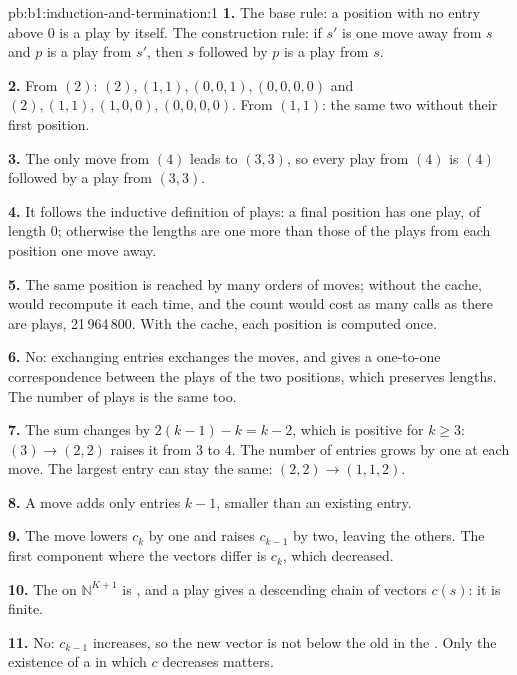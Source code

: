 \begin{solution}{pb:b1:induction-and-termination:1}
\textbf{1.} The base rule: a position with no entry above 0 is a play by itself. The construction rule: if $s'$ is one
move away from $s$ and $p$ is a play from $s'$, then $s$ followed by $p$ is a play from $s$.

\textbf{2.} From $(2)$: $(2), (1, 1), (0, 0, 1), (0, 0, 0, 0)$ and $(2), (1, 1), (1, 0, 0), (0, 0, 0, 0)$. From $(1, 1)$: the
same two without their first position.

\textbf{3.} The only move from $(4)$ leads to $(3, 3)$, so every play from $(4)$ is $(4)$ followed by a play from
$(3, 3)$.

\textbf{4.} It follows the inductive definition of plays: a final position has one play, of length 0; otherwise the
lengths are one more than those of the plays from each position one move away.

\textbf{5.} The same position is reached by many orders of moves; without the cache,  would recompute it
each time, and the count would cost as many calls as there are plays, 21\,964\,800. With the cache, each position is
computed once.

\textbf{6.} No: exchanging entries exchanges the moves, and gives a one-to-one correspondence between the plays of the
two positions, which preserves lengths. The number of plays is the same too.

\textbf{7.} The sum changes by $2(k - 1) - k = k - 2$, which is positive for $k \geq 3$: $(3) \to (2, 2)$ raises it from
3 to 4. The number of entries grows by one at each move. The largest entry can stay the same: $(2, 2) \to (1, 1, 2)$.

\textbf{8.} A move adds only entries $k - 1$, smaller than an existing entry.

\textbf{9.} The move lowers $c_k$ by one and raises $c_{k - 1}$ by two, leaving the others. The first component where
the vectors differ is $c_k$, which decreased.

\textbf{10.} The  on $\mathbb{N}^{K + 1}$ is , and a play gives a descending chain of
vectors $c(s)$: it is finite.

\textbf{11.} No: $c_{k - 1}$ increases, so the new vector is not below the old in the . Only the existence
of a  in which $c$ decreases matters.


\end{solution}

